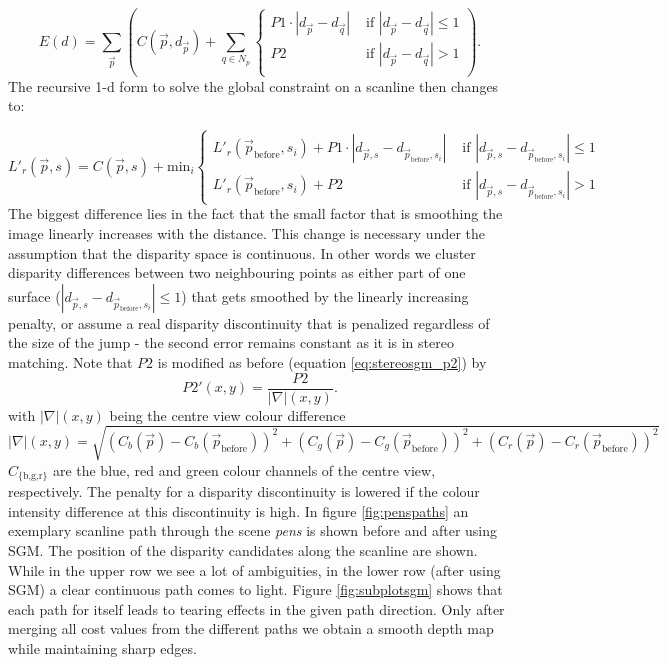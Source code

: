 \documentclass  [
  paper    = a4,
  BCOR     = 10mm,
  twoside,
  fontsize = 12pt,
  fleqn,
  toc      = bibnumbered,
  toc      = listofnumbered,
  numbers  = noendperiod,
  headings = normal,
  listof   = leveldown,
  version  = 3.03
]                                       {scrreprt}
\begin{document}
\begin{equation}\label{eq:global_sgm_cont}
E(d) = \sum_{\vec p} \left(C(\vec{p}, d_{\vec p}) + \sum_{q\in N_p} 
\begin{cases}
P1\cdot |d_{\vec p} - d_{\vec q}|  & \text{ if }|d_{\vec p} - d_{\vec q}| \leq 1\\
P2 & \text{ if }|d_{\vec p} - d_{\vec q}| > 1\\
\end{cases}  
\right).
\end{equation}
The recursive 1-d form to solve the global constraint on a scanline then changes to:

\begin{equation}\label{eq:recursive1d}
L'_r(\vec{p}, s) = C(\vec{p}, s) + \text{min}_i
\begin{cases}
L'_r(\vec{p}_\text{before}, s_i)+P1 \cdot |d_{\vec p, s} - d_{\vec{p}_\text{before}, s_i}|  & \text{ if }|d_{\vec p, s} - d_{\vec{p}_\text{before}, s_i}| \leq 1 \\
L'_r(\vec{p}_\text{before}, s_i)+P2 & \text{ if }|d_{\vec p, s} - d_{\vec{p}_\text{before}, s_i}| > 1
\end{cases}
\end{equation} 
The biggest difference lies in the fact that the small factor that is smoothing the image linearly increases with the distance. This change is necessary under the assumption that the disparity space is continuous. In other words we cluster disparity differences between two neighbouring points as either part of one surface ($|d_{\vec p, s} - d_{\vec{p}_\text{before}, s_i}| \leq 1$) that gets smoothed by the linearly increasing penalty, or assume a real disparity discontinuity that is penalized regardless of the size of the jump - the second error remains constant as it is in stereo matching. Note that $P2$ is modified as before (equation \ref{eq:stereosgm_p2}) by 
\begin{equation}\label{eq:gradientp2}
P2'(x,y) = \frac{P2}{|\nabla|(x,y)}.
\end{equation}
with $|\nabla|(x,y)$ being the centre view colour difference
 \begin{equation}\label{key}
 |\nabla|(x,y) = \sqrt{\left(C_b(\vec p) - C_b(\vec p_\text{before})\right)^2 + \left(C_g(\vec p) - C_g(\vec p_\text{before})\right)^2+ \left(C_r(\vec p) - C_r(\vec p_\text{before})\right)^2}
 \end{equation}
  $C_\text{\{b,g,r\}}$ are the blue, red and green colour channels of the centre view, respectively. The penalty for a disparity discontinuity is lowered if the colour intensity difference at this discontinuity is high. In figure \ref{fig:penspaths} an exemplary scanline path through the scene \textit{pens} is shown before and after using SGM. The position of the disparity candidates along the scanline are shown. While in the upper row we see a lot of ambiguities, in the lower row (after using SGM) a clear continuous path comes to light. Figure \ref{fig:subplotsgm} shows that each path for itself leads to tearing effects in the given path direction. Only after merging all cost values from the different paths we obtain a smooth depth map while maintaining sharp edges.
\end{document}
